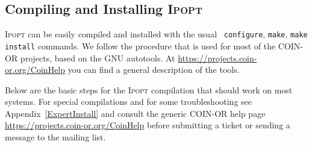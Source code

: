 \documentclass[10pt]{article}
\newcommand{\Ipopt}{\textsc{Ipopt}\xspace}
\begin{document}
\subsection{Compiling and Installing \Ipopt} \label{sec.comp_and_inst}

\Ipopt can be easily compiled and installed with the usual {\tt
  configure}, {\tt make}, {\tt make install} commands.  We follow the
procedure that is used for most of the COIN-OR projects, based on the
GNU autotools.  At \url{https://projects.coin-or.org/CoinHelp}
you can find a general description of the tools.

Below are the basic steps for the \Ipopt compilation that should work
on most systems.  For special compilations and for some
troubleshooting see Appendix~\ref{ExpertInstall} and consult the
generic COIN-OR help page
\url{https://projects.coin-or.org/CoinHelp} before submitting a
ticket or sending a message to the mailing list.
\end{document}
